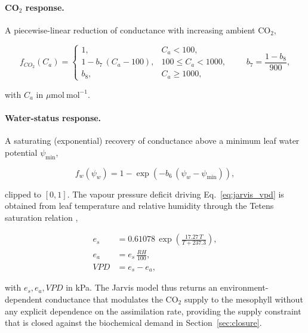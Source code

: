 \documentclass[a4paper,fleqn]{cas-sc}
\begin{document}
\paragraph{CO$_2$ response.}
A piecewise-linear reduction of conductance with increasing ambient CO$_2$,

\begin{equation}
f_{\mathit{CO_2}}(C_a) =
\begin{cases}
1, & C_a < 100, \\[4pt]
1 - b_7\,(C_a - 100), & 100 \leq C_a < 1000, \\[4pt]
b_8, & C_a \geq 1000,
\end{cases}
\qquad
b_7 = \frac{1-b_8}{900},
\label{eq:jarvis_co2}
\end{equation}

with $C_a$ in $\mu\mathrm{mol\ mol^{-1}}$.

\paragraph{Water-status response.}
A saturating (exponential) recovery of conductance above a minimum leaf
water potential $\psi_{\min}$,

\begin{equation}
f_{w}(\psi_w) =
1 - \exp\!\left(-b_6\,(\psi_w - \psi_{\min})\right),
\label{eq:jarvis_water}
\end{equation}

clipped to $[0,1]$. The vapour pressure deficit driving
Eq.~\eqref{eq:jarvis_vpd} is obtained from leaf temperature and relative
humidity through the Tetens saturation relation \citep{Monteith1965,Nobel2009},

\begin{align}
e_s &= 0.61078\,\exp\!\left(\frac{17.27\,T}{T+237.3}\right),
\label{eq:vpd_es}\\[4pt]
e_a &= e_s\,\frac{\mathit{RH}}{100},
\label{eq:vpd_ea}\\[4pt]
\mathit{VPD} &= e_s - e_a,
\label{eq:vpd_def}
\end{align}

with $e_s,e_a,\mathit{VPD}$ in kPa. The Jarvis model thus returns an
environment-dependent conductance that modulates the CO$_2$ supply to the
mesophyll without any explicit dependence on the assimilation rate,
providing the supply constraint that is closed against the biochemical
demand in Section~\ref{sec:closure}.
\end{document}
